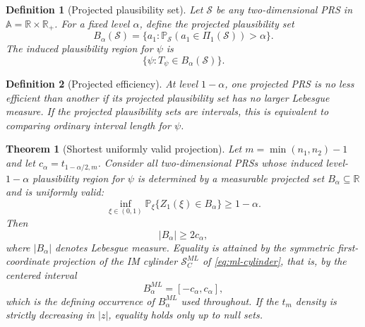 \documentclass[12pt]{article}
\newtheorem{definition}{Definition}
\newtheorem{theorem}{Theorem}
\newcommand{\R}{\mathbb R}
\newcommand{\Prb}{\mathbb P}
\begin{document}
\begin{definition}[Projected plausibility set]
Let \(\mathcal S\) be any two-dimensional PRS in
\(\mathbb A=\R\times\R_+\).  For a fixed level \(\alpha\), define the
projected plausibility set
\[
B_\alpha(\mathcal S)
=
\{a_1:\Prb_{\mathcal S}(a_1\in\Pi_1(\mathcal S))>\alpha\}.
\]
The induced plausibility region for \(\psi\) is
\[
\{\psi:T_\psi\in B_\alpha(\mathcal S)\}.
\]
\end{definition}

\begin{definition}[Projected efficiency]
At level \(1-\alpha\), one projected PRS is no less efficient than another if
its projected plausibility set has no larger Lebesgue measure.  If the
projected plausibility sets are intervals, this is equivalent to comparing
ordinary interval length for \(\psi\).
\end{definition}

\begin{theorem}[Shortest uniformly valid projection]
Let \(m=\min(n_1,n_2)-1\) and let \(c_\alpha=t_{1-\alpha/2,m}\).  Consider
all two-dimensional PRSs whose induced level-\(1-\alpha\) plausibility region
for \(\psi\) is determined by a measurable projected set \(B_\alpha\subseteq
\R\) and is uniformly valid:
\[
\inf_{\xi\in(0,1)}
\Prb_\xi\{Z_1(\xi)\in B_\alpha\}
\geq 1-\alpha.
\]
Then
\[
|B_\alpha|\geq 2c_\alpha,
\]
where \(|B_\alpha|\) denotes Lebesgue measure.  Equality is attained by the
symmetric first-coordinate projection of the IM cylinder \(\mathcal S_C^{ML}\)
of \eqref{eq:ml-cylinder}, that is, by the centered interval
\[
B_\alpha^{ML}=[-c_\alpha,c_\alpha],
\]
which is the defining occurrence of \(B_\alpha^{ML}\) used throughout.
If the \(t_m\) density is strictly decreasing in \(|z|\), equality holds only
up to null sets.
\end{theorem}
\end{document}
